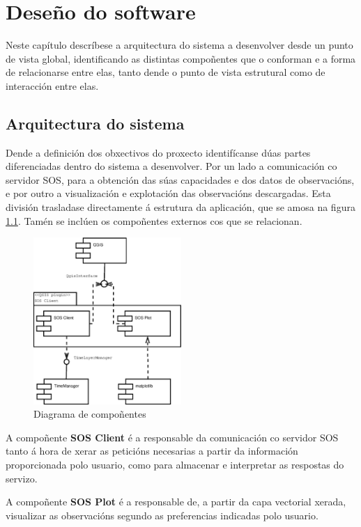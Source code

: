\chapter{Deseño do software}
Neste capítulo descríbese a arquitectura do sistema a desenvolver desde un punto de vista global, identificando as distintas compoñentes que o conforman e a forma de relacionarse entre elas, tanto dende o punto de vista estrutural como de interacción entre elas.

\section{Arquitectura do sistema}
Dende a definición dos obxectivos do proxecto identifícanse dúas partes diferenciadas dentro do sistema a desenvolver. Por un lado a comunicación co servidor SOS, para a obtención das súas capacidades e dos datos de observacións, e por outro a visualización e explotación das observacións descargadas. Esta división trasladase directamente á estrutura da aplicación, que se amosa na figura \ref{fig:diaComponentes}. Tamén se inclúen os compoñentes externos cos que se relacionan.

\begin{figure}[hbtp]
 \centering
 \includegraphics[width=0.5\textwidth]{images/componentes.eps}
 \caption{Diagrama de compoñentes}
 \label{fig:diaComponentes}
\end{figure}

A compoñente \textbf{SOS Client} é a responsable da comunicación co servidor SOS tanto á hora de xerar as peticións necesarias a partir da información proporcionada polo usuario, como para almacenar e interpretar as respostas do servizo.

A compoñente \textbf{SOS Plot} é a responsable de, a partir da capa vectorial xerada, visualizar as observacións segundo as preferencias indicadas polo usuario.

